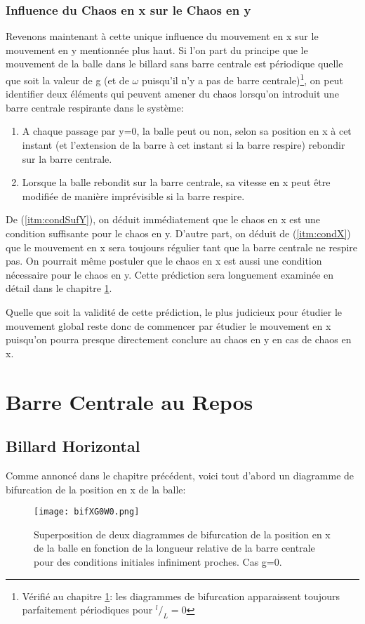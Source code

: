 \documentclass[a4paper]{report}
\begin{document}
\subsection{Influence du Chaos en x sur le Chaos en y}
\label{sec:chaosXY}
Revenons maintenant à cette unique influence du mouvement en x sur le mouvement en y mentionnée plus haut. Si l'on part du principe que le mouvement de la balle dans le billard sans barre centrale est périodique quelle que soit la valeur de g (et de \(\omega\) puisqu'il n'y a pas de barre centrale)\footnote{Vérifié au chapitre \ref{chap:barRepos}: les diagrammes de bifurcation apparaissent toujours parfaitement périodiques pour \(^{l}/_L=0\)}, on peut identifier deux éléments qui peuvent amener du chaos lorsqu'on introduit une barre centrale respirante dans le système:
\begin{enumerate}
 \item A chaque passage par y=0, la balle peut ou non, selon sa position en x à cet instant (et l'extension de la barre à cet instant si la barre respire) rebondir sur la barre centrale.\label{itm:condSufY}
 \item Lorsque la balle rebondit sur la barre centrale, sa vitesse en x peut être modifiée de manière imprévisible si la barre respire.\label{itm:condX}
\end{enumerate}

De (\ref{itm:condSufY}), on déduit immédiatement que le chaos en x est une condition suffisante pour le chaos en y. D'autre part, on déduit de (\ref{itm:condX}) que le mouvement en x sera toujours régulier tant que la barre centrale ne respire pas. On pourrait même postuler que le chaos en x est aussi une condition nécessaire pour le chaos en y. Cette prédiction sera longuement examinée en détail dans le chapitre \ref{chap:barRepos}.

Quelle que soit la validité de cette prédiction, le plus judicieux pour étudier le mouvement global reste donc de commencer par étudier le mouvement en x puisqu'on pourra presque directement conclure au chaos en y en cas de chaos en x.

\chapter{Barre Centrale au Repos}
\label{chap:barRepos}

\section{Billard Horizontal}
\label{sec:xRegHor}
Comme annoncé dans le chapitre précédent, voici tout d'abord un diagramme de bifurcation de la position en x de la balle:
\begin{figure}[h!]
   \texttt{[image: bifXG0W0.png]}
      \caption[Diagramme de bifurcation en x: g=0 ]{Superposition de deux diagrammes de bifurcation de la position en x de la balle en fonction de la longueur relative de la barre centrale pour des conditions initiales infiniment proches. Cas g=0.}
\end{figure}
\end{document}
